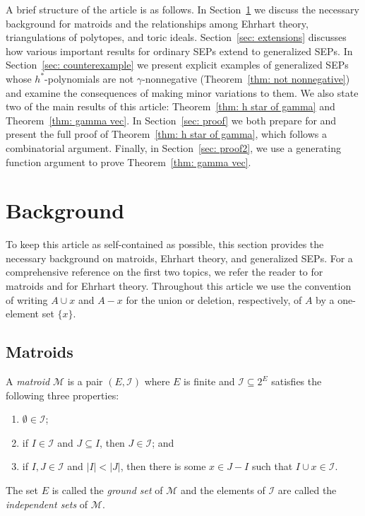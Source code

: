 \documentclass{amsart}
\numberwithin{equation}{section}
\theoremstyle{plain}
\theoremstyle{definition}
\newcommand{\calI}{\mathcal{I}}
\newcommand{\calM}{\mathcal{M}}
\begin{document}
    A brief structure of the article is as follows.
    In Section~\ref{sec: background} we discuss the necessary background for matroids and the relationships among Ehrhart theory, triangulations of polytopes, and toric ideals.
    Section~\ref{sec: extensions} discusses how various important results for ordinary SEPs extend to generalized SEPs.
    In Section~\ref{sec: counterexample} we present explicit examples of generalized SEPs whose $h^*$-polynomials are not $\gamma$-nonnegative (Theorem~\ref{thm: not nonnegative}) and examine the consequences of making minor variations to them.
    We also state two of the main results of this article: Theorem~\ref{thm: h star of gamma} and Theorem~\ref{thm: gamma vec}.
    In Section~\ref{sec: proof} we both prepare for and present the full proof of Theorem~\ref{thm: h star of gamma}, which follows a combinatorial argument.
    Finally, in Section~\ref{sec: proof2}, we use a generating function argument to prove Theorem~\ref{thm: gamma vec}.

\section{Background}\label{sec: background}

To keep this article as self-contained as possible, this section provides the necessary background on matroids, Ehrhart theory, and generalized SEPs.
For a comprehensive reference on the first two topics, we refer the reader to \cite{Oxley} for matroids and \cite{BeckRobins} for Ehrhart theory. 
Throughout this article we use the convention of writing $A \cup x$ and $A - x$ for the union or deletion, respectively, of $A$ by a one-element set $\{x\}$.

\subsection{Matroids}

A \emph{matroid} $\calM$ is a pair $(E,\calI)$ where $E$ is finite and $\calI \subseteq 2^E$ satisfies the following three properties:
\begin{enumerate}[label=(\roman*)]
    \item $\emptyset \in \calI$;
    \item if $I \in \calI$ and $J \subseteq I$, then $J \in \calI$; and
    \item if $I, J \in \calI$ and $|I| < |J|$, then there is some $x \in J - I$ such that $I \cup x \in \calI$.
\end{enumerate}
The set $E$ is called the \emph{ground set} of $\calM$ and the elements of $\calI$ are called the \emph{independent sets} of $\calM$.
\end{document}
